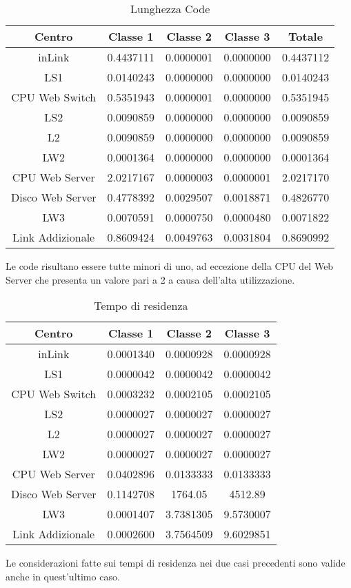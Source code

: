 \begin{table}[htbp]
\begin{center}
\begin{tabular}{|c|c|c|c|c|}
\hline
Centro	&Classe 1	&Classe 2	&Classe 3 &Totale\\
\hline
\hline
inLink & 0.4437111 & 0.0000001 & 0.0000000 & 0.4437112 \\ \hline
LS1 & 0.0140243 & 0.0000000 & 0.0000000 & 0.0140243 \\ \hline
CPU Web Switch & 0.5351943 & 0.0000001 & 0.0000000 & 0.5351945 \\ \hline
LS2 & 0.0090859 & 0.0000000 & 0.0000000 & 0.0090859 \\ \hline
L2 & 0.0090859 & 0.0000000 & 0.0000000 & 0.0090859 \\ \hline
LW2 & 0.0001364 & 0.0000000 & 0.0000000 & 0.0001364 \\ \hline
CPU Web Server & 2.0217167 & 0.0000003 & 0.0000001 & 2.0217170 \\ \hline
Disco Web Server & 0.4778392 & 0.0029507 & 0.0018871 & 0.4826770 \\ \hline
LW3 & 0.0070591 & 0.0000750 & 0.0000480 & 0.0071822 \\ \hline
Link Addizionale & 0.8609424 & 0.0049763 & 0.0031804 & 0.8690992 \\ \hline
\end{tabular}
\end{center}
\caption{Lunghezza Code}
\label{lunghezzacode}
\end{table}
Le code risultano essere tutte minori di uno, ad eccezione della CPU del Web Server che presenta un valore pari a 2 a causa dell'alta utilizzazione.
\begin{table}[htbp]
\begin{center}
\begin{tabular}{|c|c|c|c|}
\hline
Centro	&Classe 1	&Classe 2	&Classe 3 \\
\hline
\hline
inLink & 0.0001340 & 0.0000928 & 0.0000928 \\ \hline
LS1 & 0.0000042 & 0.0000042 & 0.0000042 \\ \hline
CPU Web Switch & 0.0003232 & 0.0002105 & 0.0002105 \\ \hline
LS2 & 0.0000027 & 0.0000027 & 0.0000027 \\ \hline
L2 & 0.0000027 & 0.0000027 & 0.0000027 \\ \hline
LW2 & 0.0000027 & 0.0000027 & 0.0000027 \\ \hline
CPU Web Server & 0.0402896 & 0.0133333 & 0.0133333 \\ \hline
Disco Web Server & 0.1142708 & 1764.05 & 4512.89 \\ \hline
LW3 & 0.0001407 & 3.7381305 & 9.5730007 \\ \hline
Link Addizionale & 0.0002600 & 3.7564509 & 9.6029851 \\ \hline
\end{tabular}
\end{center}
\caption{Tempo di residenza}
\label{tempodiresidenza}
\end{table}
Le considerazioni fatte sui tempi di residenza nei due casi precedenti sono valide anche in quest'ultimo caso. 

